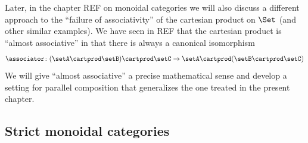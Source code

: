 Later, in the chapter REF   on monoidal categories we will also discuss a different approach to the ``failure of associativity'' of the cartesian product on $\Set$ (and other similar examples). We have seen in REF   that the cartesian product is ``almost associative'' in that there is always a canonical isomorphism
\begin{equation}
    \associator \colon (\setA \cartprod \setB) \cartprod \setC \to \setA \cartprod (\setB \cartprod \setC)
\end{equation}
We will give ``almost associative'' a precise mathematical sense and develop a setting for parallel composition that generalizes the one treated in the present chapter.  






\subsection{Strict monoidal categories}



